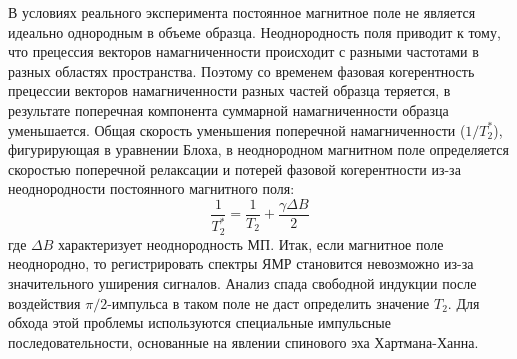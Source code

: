 В условиях реального эксперимента постоянное магнитное поле не является идеально однородным в объеме образца. 
Неоднородность поля приводит к тому, что прецессия векторов намагниченности происходит с разными частотами в разных областях пространства. 
Поэтому со временем фазовая когерентность прецессии векторов намагниченности разных частей образца теряется, в результате поперечная компонента суммарной намагниченности образца уменьшается. 
Общая скорость уменьшения поперечной намагниченности ($ 1/T_2^* $), фигурирующая в уравнении Блоха, в неоднородном магнитном поле определяется скоростью поперечной релаксации и потерей фазовой когерентности из-за неоднородности постоянного магнитного поля:
\begin{equation}
\label{T2*_def}
\dfrac{1}{T_2^*} = \dfrac{1}{T_2} + \dfrac{\gamma \Delta B}{2}
\end{equation}
где $ \Delta B $ характеризует неоднородность МП.
Итак, если магнитное поле неоднородно, то регистрировать спектры ЯМР становится невозможно из-за значительного уширения сигналов. Анализ спада свободной индукции после воздействия $ \pi /2 $-импульса в таком поле не даст определить значение $ T_2 $. Для обхода этой проблемы используются специальные импульсные последовательности, основанные на явлении спинового эха Хартмана-Ханна.

